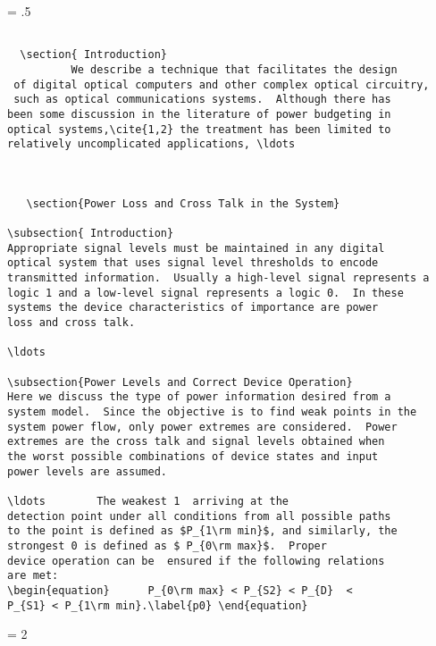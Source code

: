 \newpage
\baselineskip = .5\baselineskip  %
\begin{verbatim}

  \section{ Introduction}
          We describe a technique that facilitates the design
 of digital optical computers and other complex optical circuitry,
 such as optical communications systems.  Although there has
been some discussion in the literature of power budgeting in
optical systems,\cite{1,2} the treatment has been limited to
relatively uncomplicated applications, \ldots



   \section{Power Loss and Cross Talk in the System}

\subsection{ Introduction}
Appropriate signal levels must be maintained in any digital
optical system that uses signal level thresholds to encode
transmitted information.  Usually a high-level signal represents a
logic 1 and a low-level signal represents a logic 0.  In these
systems the device characteristics of importance are power
loss and cross talk.

\ldots

\subsection{Power Levels and Correct Device Operation}
Here we discuss the type of power information desired from a
system model.  Since the objective is to find weak points in the
system power flow, only power extremes are considered.  Power
extremes are the cross talk and signal levels obtained when
the worst possible combinations of device states and input
power levels are assumed.

\ldots        The weakest 1  arriving at the
detection point under all conditions from all possible paths
to the point is defined as $P_{1\rm min}$, and similarly, the
strongest 0 is defined as $ P_{0\rm max}$.  Proper
device operation can be  ensured if the following relations
are met:
\begin{equation}      P_{0\rm max} < P_{S2} < P_{D}  <
P_{S1} < P_{1\rm min}.\label{p0} \end{equation}

\end{verbatim}
\newpage
\baselineskip = 2\baselineskip  %


